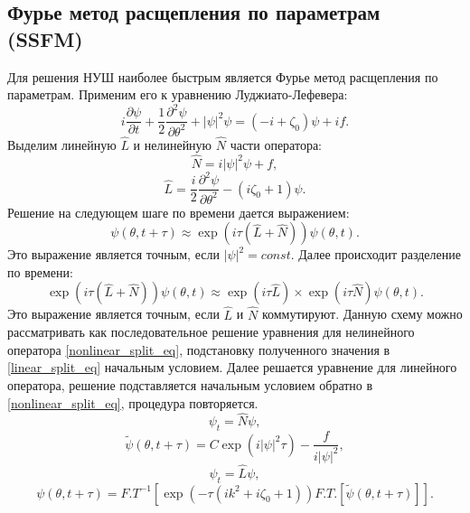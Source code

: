 \subsection{Фурье метод расщепления по параметрам (SSFM)}
Для решения НУШ наиболее быстрым является Фурье метод расщепления по параметрам. Применим его к уравнению Луджиато-Лефевера:
\begin{equation}
i\frac{\partial \psi}{\partial t}+\frac{1}{2}\frac{\partial^2 \psi}{\partial \theta^2}+|\psi|^2\psi=(-i+\zeta_0)\psi+if.
\end{equation}
Выделим линейную $\hat{L}$ и нелинейную $\hat{N}$ части оператора:
\begin{equation}
\hat{N}=i|\psi|^2\psi+f,
\end{equation}
\begin{equation}
\hat{L}=\frac{i}{2}\frac{\partial^2\psi}{\partial \theta^2}-(i\zeta_0+1)\psi.
\end{equation}
Решение на следующем шаге по времени дается выражением:
\begin{equation}
\psi(\theta,t+\tau)\approx\exp (i\tau(\hat{L}+\hat{N}))\psi(\theta,t).
\end{equation}
Это выражение является точным, если $|\psi|^2=const$. Далее происходит разделение по времени:
\begin{equation}
\exp (i\tau(\hat{L}+\hat{N}))\psi(\theta,t)
\approx\exp(i\tau\hat{L})\times\exp(i\tau\hat{N})\psi(\theta,t).
\end{equation}
Это выражение является точным, если $\hat{L}$ и $\hat{N}$ коммутируют. Данную схему можно рассматривать как последовательное решение уравнения для нелинейного оператора \eqref{nonlinear_split_eq}, подстановку полученного значения в \eqref{linear_split_eq} начальным условием. Далее решается уравнение для линейного оператора, решение подставляется начальным условием обратно в \eqref{nonlinear_split_eq}, процедура повторяется.
\begin{equation}\label{nonlinear_split_eq}
\psi_t=\hat{N}\psi,
\end{equation}
\begin{equation}
\tilde{\psi}(\theta,t+\tau)=C\exp(i|\psi|^2\tau)-\frac{f}{i|\psi|^2},
\end{equation}
\begin{equation}\label{linear_split_eq}
\psi_t=\hat{L}\psi,
\end{equation}
\begin{equation}
\psi(\theta,t+\tau)=F.T^{-1}[\exp(-\tau(ik^2+i\zeta_0+1))F.T.[\tilde{\psi}(\theta,t+\tau)]].
\end{equation}

